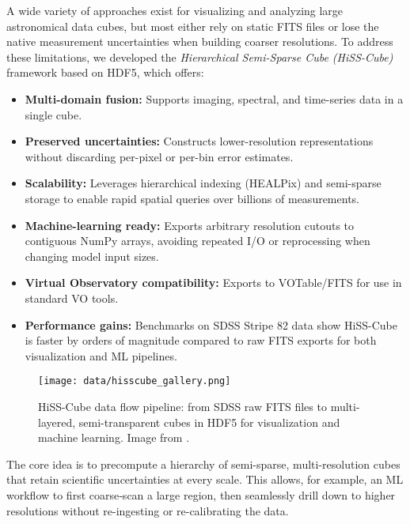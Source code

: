 \documentclass[english,bachelor,oneside]{ctufit-thesis}
\begin{document}
A wide variety of approaches exist for visualizing and analyzing large astronomical data cubes, but most either rely on static FITS files or lose the native measurement uncertainties when building coarser resolutions. To address these limitations, we developed the \emph{Hierarchical Semi-Sparse Cube (HiSS-Cube)} framework based on HDF5, which offers:

\begin{itemize}
  \item \textbf{Multi-domain fusion:} Supports imaging, spectral, and time-series data in a single cube.
  \item \textbf{Preserved uncertainties:} Constructs lower-resolution representations without discarding per-pixel or per-bin error estimates.
  \item \textbf{Scalability:} Leverages hierarchical indexing (HEALPix) and semi-sparse storage to enable rapid spatial queries over billions of measurements.
  \item \textbf{Machine-learning ready:} Exports arbitrary resolution cutouts to contiguous NumPy arrays, avoiding repeated I/O or reprocessing when changing model input sizes.
  \item \textbf{Virtual Observatory compatibility:} Exports to VOTable/FITS for use in standard VO tools.
  \item \textbf{Performance gains:} Benchmarks on SDSS Stripe 82 data show HiSS-Cube is faster by orders of magnitude compared to raw FITS exports for both visualization and ML pipelines.
\end{itemize}

\begin{figure}[H]
  \centering
  \texttt{[image: data/hisscube\_gallery.png]}
  \caption{HiSS-Cube data flow pipeline: from SDSS raw FITS files to multi-layered, semi-transparent cubes in HDF5 for visualization and machine learning. Image from \cite{nadvornik2021hiss}.}
  \label{fig:hisscube_pipeline}
\end{figure}

The core idea is to precompute a hierarchy of semi-sparse, multi-resolution cubes that retain scientific uncertainties at every scale. This allows, for example, an ML workflow to first coarse‐scan a large region, then seamlessly drill down to higher resolutions without re-ingesting or re-calibrating the data. \cite{nadvornik2021hiss}
\end{document}
